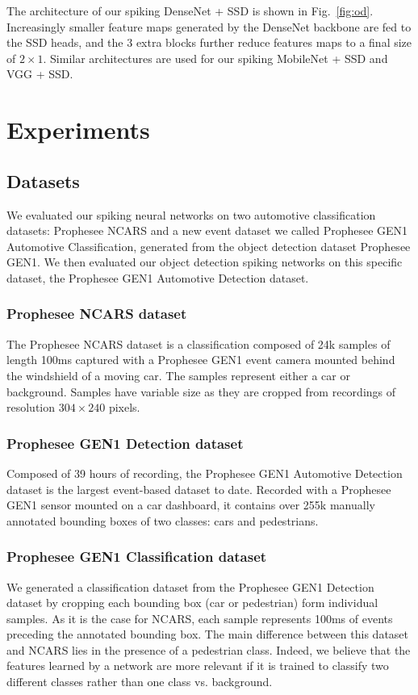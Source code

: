 \documentclass[conference]{IEEEtran}
\begin{document}
The architecture of our spiking DenseNet + SSD is shown in Fig.~\ref{fig:od}. Increasingly smaller feature maps generated by the DenseNet backbone are fed to the SSD heads, and the 3 extra blocks further reduce features maps to a final size of $2\times1$. Similar architectures are used for our spiking MobileNet + SSD and VGG + SSD.


\section{Experiments}

\subsection{Datasets}

We evaluated our spiking neural networks on two automotive classification datasets: Prophesee NCARS and a new event dataset we called Prophesee GEN1 Automotive Classification, generated from the object detection dataset Prophesee GEN1. We then evaluated our object detection spiking networks on this specific dataset, the Prophesee GEN1 Automotive Detection dataset.

\subsubsection{Prophesee NCARS dataset} 
The Prophesee NCARS dataset \cite{ncars} is a classification composed of 24k samples of length 100ms captured with a Prophesee GEN1 event camera mounted behind the windshield of a moving car. The samples represent either a car or background. Samples have variable size as they are cropped from recordings of resolution $304 \times 240$ pixels.

\subsubsection{Prophesee GEN1 Detection dataset} 
Composed of 39 hours of recording, the Prophesee GEN1 Automotive Detection dataset \cite{gen1} is the largest event-based dataset to date. Recorded with a Prophesee GEN1 sensor mounted on a car dashboard, it contains over 255k manually annotated bounding boxes of two classes: cars and pedestrians.

\subsubsection{Prophesee GEN1 Classification dataset} 
We generated a classification dataset from the Prophesee GEN1 Detection dataset by cropping each bounding box (car or pedestrian) form individual samples. As it is the case for NCARS, each sample represents 100ms of events preceding the annotated bounding box. The main difference between this dataset and NCARS lies in the presence of a pedestrian class. Indeed, we believe that the features learned by a network are more relevant if it is trained to classify two different classes rather than one class vs. background. 
\end{document}
